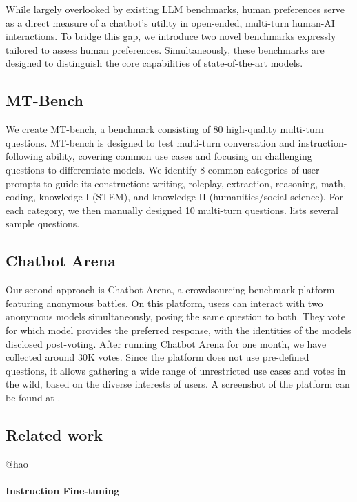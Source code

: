 While largely overlooked by existing LLM benchmarks, human preferences serve as a direct measure of a chatbot's utility in open-ended, multi-turn human-AI interactions. To bridge this gap, we introduce two novel benchmarks expressly tailored to assess human preferences. Simultaneously, these benchmarks are designed to distinguish the core capabilities of state-of-the-art models.


\subsection{MT-Bench}
We create MT-bench, a benchmark consisting of 80 high-quality multi-turn questions.
MT-bench is designed to test multi-turn conversation and instruction-following ability, covering common use cases and focusing on challenging questions to differentiate models.
We identify 8 common categories of user prompts to guide its construction: writing, roleplay, extraction, reasoning, math, coding, knowledge I (STEM), and knowledge II (humanities/social science).
For each category, we then manually designed 10 multi-turn questions.
 lists several sample questions.



\subsection{Chatbot Arena}
Our second approach is Chatbot Arena, a crowdsourcing benchmark platform featuring anonymous battles.
On this platform, users can interact with two anonymous models simultaneously, posing the same question to both. They vote for which model provides the preferred response, with the identities of the models disclosed post-voting. After running Chatbot Arena for one month, we have collected around 30K votes. Since the platform does not use pre-defined questions, it allows gathering a wide range of unrestricted use cases and votes in the wild, based on the diverse interests of users. A screenshot of the platform can be found at .




\subsection{Related work}
\label{sec:related-work}
@hao

\paragraph{Instruction Fine-tuning}

